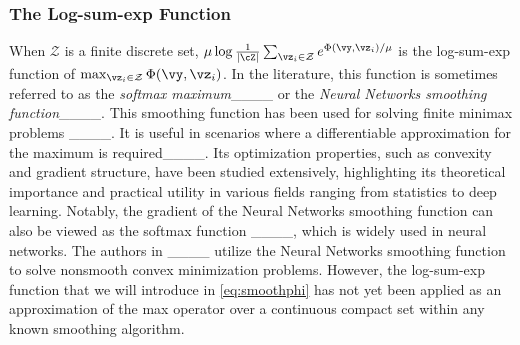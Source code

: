		
		
		\subsubsection{The Log-sum-exp Function}
		When $\mathcal{Z}$ is a finite discrete set, $\mu \log \frac{1}{|\cZ|}\sum_{\vz_i\in\mathcal{Z}} e^{\Phi(\vy,\vz_i)/\mu}$ is the log-sum-exp function of  $\max_{\vz_i\in\mathcal{Z}} \Phi(\vy,\vz_i)$. In the literature, this function is sometimes referred to as the \emph{softmax maximum}____ or the \emph{Neural Networks smoothing  function}____. This smoothing function has been used for solving finite minimax problems ____. It is useful in scenarios where a differentiable approximation for the maximum is required____.
		Its optimization properties, such as convexity and gradient structure, have been studied extensively, highlighting its theoretical importance and practical utility in various fields ranging from statistics to deep learning. Notably, the gradient of the Neural Networks smoothing  function can also be viewed as the softmax function ____, which is widely used in neural networks.
		The authors in ____ utilize the Neural Networks smoothing function to solve nonsmooth convex minimization problems.  
		However, 	the log-sum-exp function that we will introduce in \eqref{eq:smoothphi} has not yet been applied as an approximation of the max operator over a continuous compact set within any known smoothing algorithm. %